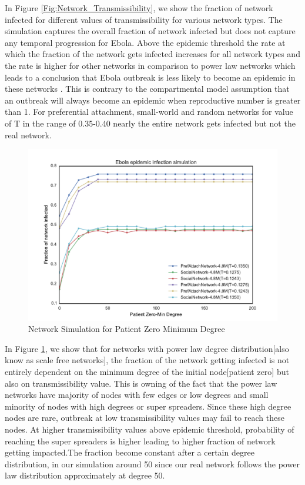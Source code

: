\documentclass[10pt, journal,onecolumn]{IEEEtran}
\begin{document}
In Figure  \ref{Fig:Network_Transmissibility}, we show the fraction of network infected for different values of transmissibility for  various network types.  The simulation captures the overall fraction of network infected  but does not capture any temporal progression for Ebola. Above the epidemic threshold the rate at which the  fraction of the network gets infected increases for all network types and the rate is higher for other networks in comparison to power law networks which leads to a conclusion that Ebola outbreak is less likely to become an epidemic in these networks . This is contrary to the compartmental model assumption that an outbreak will always become an epidemic when reproductive number is greater than 1. For preferential attachment, small-world and random networks for value of T in the range of 0.35-0.40 nearly the entire network gets infected but not the real network.

\begin{figure}[ht]
\centering
\includegraphics[scale=.8]{EbolaMinDeg.pdf}
\caption{Network Simulation for Patient Zero Minimum Degree}
\label{Fig:Network_MinDegree}
\end{figure}



In Figure \ref{Fig:Network_MinDegree}, we show that  for networks with power law degree distribution[also know as scale free networks], the fraction of the network getting infected is not entirely dependent on the minimum degree of the  initial node[patient zero] but also on transmissibility value. This is owning of the fact that the power law networks have majority  of nodes with few edges or low degrees and small minority of nodes with high degrees or super spreaders. Since these high degree nodes are rare, outbreak at low transmissibility values  may fail to reach these nodes. At higher transmissibility values above epidemic threshold, probability of reaching the super spreaders is higher leading to higher fraction of network getting impacted.The fraction become constant after a certain degree distribution, in our simulation around 50 since our real network follows the power law distribution approximately at degree 50. 
\end{document}
